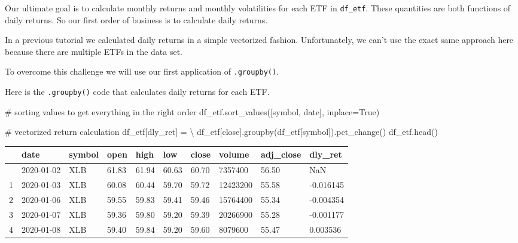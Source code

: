\documentclass[
  letterpaper,
  DIV=11,
  numbers=noendperiod]{scrreprt}
\newenvironment{Shaded}{\begin{snugshade}}{\end{snugshade}}
\newcommand{\CommentTok}[1]{\textcolor[rgb]{0.37,0.37,0.37}{#1}}
\newcommand{\NormalTok}[1]{\textcolor[rgb]{0.00,0.23,0.31}{#1}}
\newcommand{\OperatorTok}[1]{\textcolor[rgb]{0.37,0.37,0.37}{#1}}
\newcommand{\StringTok}[1]{\textcolor[rgb]{0.13,0.47,0.30}{#1}}
\newcommand{\VariableTok}[1]{\textcolor[rgb]{0.07,0.07,0.07}{#1}}
\begin{document}
Our ultimate goal is to calculate monthly returns and monthly
volatilities for each ETF in \texttt{df\_etf}. These quantities are both
functions of daily returns. So our first order of business is to
calculate daily returns.

In a previous tutorial we calculated daily returns in a simple
vectorized fashion. Unfortunately, we can't use the exact same approach
here because there are multiple ETFs in the data set.

To overcome this challenge we will use our first application of
\texttt{.groupby()}.

Here is the \texttt{.groupby()} code that calculates daily returns for
each ETF.

\begin{Shaded}
\begin{Highlighting}[]
\CommentTok{\# sorting values to get everything in the right order}
\NormalTok{df\_etf.sort\_values([}\StringTok{\textquotesingle{}symbol\textquotesingle{}}\NormalTok{, }\StringTok{\textquotesingle{}date\textquotesingle{}}\NormalTok{], inplace}\OperatorTok{=}\VariableTok{True}\NormalTok{)}

\CommentTok{\# vectorized return calculation}
\NormalTok{df\_etf[}\StringTok{\textquotesingle{}dly\_ret\textquotesingle{}}\NormalTok{] }\OperatorTok{=} \OperatorTok{\textbackslash{}}
\NormalTok{    df\_etf[}\StringTok{\textquotesingle{}close\textquotesingle{}}\NormalTok{].groupby(df\_etf[}\StringTok{\textquotesingle{}symbol\textquotesingle{}}\NormalTok{]).pct\_change()}
\NormalTok{df\_etf.head()}
\end{Highlighting}
\end{Shaded}

\begin{longtable}[]{@{}llllllllll@{}}
\toprule\noalign{}
& date & symbol & open & high & low & close & volume & adj\_close &
dly\_ret \\
\midrule\noalign{}
\endhead
\bottomrule\noalign{}
\endlastfoot
0 & 2020-01-02 & XLB & 61.83 & 61.94 & 60.63 & 60.70 & 7357400 & 56.50 &
NaN \\
1 & 2020-01-03 & XLB & 60.08 & 60.44 & 59.70 & 59.72 & 12423200 & 55.58
& -0.016145 \\
2 & 2020-01-06 & XLB & 59.55 & 59.83 & 59.41 & 59.46 & 15764400 & 55.34
& -0.004354 \\
3 & 2020-01-07 & XLB & 59.36 & 59.80 & 59.20 & 59.39 & 20266900 & 55.28
& -0.001177 \\
4 & 2020-01-08 & XLB & 59.40 & 59.84 & 59.20 & 59.60 & 8079600 & 55.47 &
0.003536 \\
\end{longtable}
\end{document}
